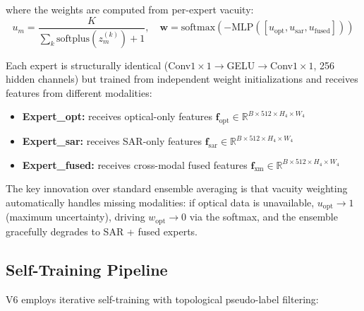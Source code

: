 where the weights are computed from per-expert vacuity:
\begin{equation}
    u_m = \frac{K}{\sum_k \text{softplus}(z_m^{(k)}) + 1}, \quad
    \mathbf{w} = \text{softmax}(-\text{MLP}([u_{\text{opt}}, u_{\text{sar}}, u_{\text{fused}}]))
\end{equation}

Each expert is structurally identical (Conv$1\times1$$\to$GELU$\to$Conv$1\times1$,
256 hidden channels) but trained from independent weight initializations and
receives features from different modalities:

\begin{itemize}[nosep]
    \item \textbf{Expert\_opt:} receives optical-only features
    $\mathbf{f}_{\text{opt}} \in \mathbb{R}^{B \times 512 \times H_4 \times W_4}$
    \item \textbf{Expert\_sar:} receives SAR-only features
    $\mathbf{f}_{\text{sar}} \in \mathbb{R}^{B \times 512 \times H_4 \times W_4}$
    \item \textbf{Expert\_fused:} receives cross-modal fused features
    $\mathbf{f}_{\text{xm}} \in \mathbb{R}^{B \times 512 \times H_4 \times W_4}$
\end{itemize}

The key innovation over standard ensemble averaging is that vacuity weighting
automatically handles missing modalities: if optical data is unavailable,
$u_{\text{opt}} \to 1$ (maximum uncertainty), driving $w_{\text{opt}} \to 0$
via the softmax, and the ensemble gracefully degrades to SAR + fused experts.

\subsection{Self-Training Pipeline}

V6 employs iterative self-training with topological pseudo-label filtering:

